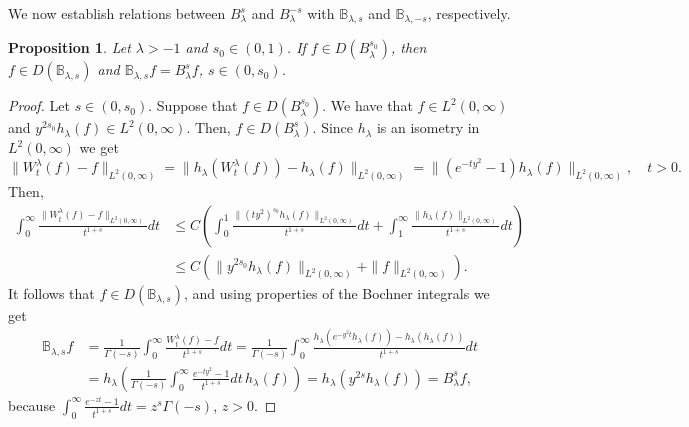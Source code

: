 \documentclass[a4paper,10pt, reqno]{amsart}
\newtheorem{prop}[thm]{Proposition}
\theoremstyle{definition}
\theoremstyle{remark}
\numberwithin{equation}{section}
\begin{document}
We now establish relations between $B_\lambda^s$ and $B_\lambda^{-s}$ with $\mathbb B_{\lambda , s}$ and $\mathbb B_{\lambda , -s}$, respectively.


\begin{prop}\label{prop: Prop2.1}
  Let $\lambda >-1$ and $s_0\in (0,1)$. If $f\in D(B_\lambda^{s_0})$, then $f\in D(\mathbb B_{\lambda ,s})$ and $\mathbb B_{\lambda ,s}f=B_\lambda^sf$, $s\in (0,s_0)$.  
\end{prop}
\begin{proof}
Let $s\in (0,s_0)$. Suppose that $f\in D(B_\lambda^{s_0})$. We have that $f\in L^2(0,\infty)$ and $y^{2{s_0}}h_\lambda (f)\in L^2(0,\infty)$. Then, $f\in D(B_\lambda^s)$. Since $h_\lambda $ is an isometry in $L^2(0,\infty)$ we get
\[
\|W_t^\lambda (f)-f\|_{L^2 (0,\infty)}=\|h_\lambda (W_t^\lambda (f))-h_\lambda (f)\|_{L^2(0,\infty)}=\|(e^{-ty^2}-1)h_\lambda (f)\|_{L^2(0,\infty)},\quad t>0.
\]
Then,
\begin{align*}
    \int_0^\infty \frac{\|W_t^\lambda (f)-f\|_{L^2(0,\infty)}}{t^{1+s}}dt&\leq C\left(\int_0^1\frac{\|(ty^2)^{s_0}h_\lambda (f)\|_{L^2(0,\infty)}}{t^{1+s}}dt+\int_1^\infty \frac{\|h_\lambda (f)\|_{L^2(0,\infty)}}{t^{1+s}}dt\right)\\
    &\leq C\left(\|y^{2s_0}h_\lambda (f)\|_{L^2(0,\infty)}+\|f\|_{L^2(0,\infty)}\right).
\end{align*}
It follows that $f\in D(\mathbb B_{\lambda ,s})$, and using properties of the Bochner integrals we get
\begin{align*}
\mathbb B_{\lambda ,s}f&=\frac{1}{\Gamma (-s)}\int_0^\infty \frac{W_t^\lambda (f)-f}{t^{1+s}}dt=\frac{1}{\Gamma (-s)}\int_0^\infty\frac{h_\lambda (e^{-y^2t}h_\lambda (f))-h_\lambda (h_\lambda (f))}{t^{1+s}}dt\\
    &=h_\lambda \left(\frac{1}{\Gamma (-s)}\int_0^\infty \frac{e^{-ty^2}-1}{t^{1+s}}dt\,h_\lambda (f)\right)=h_\lambda (y^{2s}h_\lambda (f))=B_\lambda^sf,
\end{align*}
because $\int_0^\infty \frac{e^{-zt}-1}{t^{1+s}}dt=z^s\Gamma (-s)$, $z>0$.
\end{proof}
\end{document}
